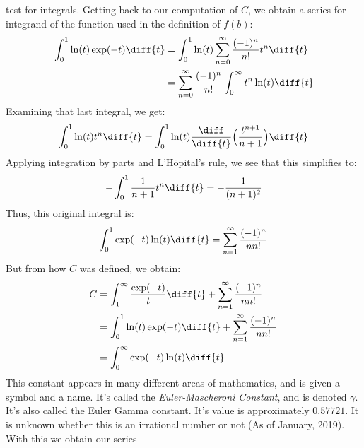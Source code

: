             test for integrals. Getting back to our computation
            of $C$, we obtain a series for integrand of the function
            used in the definition of $f(b)$:
            \begin{align}
                \int_{0}^{1}\ln(t)\exp(-t)\diff{t}
                &=\int_{0}^{1}\ln(t)\sum_{n=0}^{\infty}
                    \frac{(-1)^{n}}{n!}t^{n}\diff{t}\\
                &=\sum_{n=0}^{\infty}\frac{(-1)^{n}}{n!}
                \int_{0}^{\infty}t^{n}\ln(t)\diff{t}
            \end{align}
            Examining that last integral, we get:
            \begin{equation}
                \int_{0}^{1}\ln(t)t^{n}\diff{t}
                =\int_{0}^{1}\ln(t)\frac{\diff}{\diff{t}}
                    \Big(\frac{t^{n+1}}{n+1}\Big)\diff{t}
            \end{equation}
            Applying integration by parts and L'H\"{o}pital's rule,
            we see that this simplifies to:
            \begin{equation}
                -\int_{0}^{1}\frac{1}{n+1}t^{n}\diff{t}
                =-\frac{1}{(n+1)^{2}}
            \end{equation}
            Thus, this original integral is:
            \begin{equation}
                \int_{0}^{1}\exp(-t)\ln(t)\diff{t}
                =\sum_{n=1}^{\infty}\frac{(-1)^{n}}{nn!}
            \end{equation}
            But from how $C$ was defined, we obtain:
            \begin{align}
                C&=\int_{1}^{\infty}\frac{\exp(-t)}{t}\diff{t}
                +\sum_{n=1}^{\infty}\frac{(-1)^{n}}{nn!}\\
                &=\int_{0}^{1}\ln(t)\exp(-t)\diff{t}
                +\sum_{n=1}^{\infty}\frac{(-1)^{n}}{nn!}\\
                &=\int_{0}^{\infty}\exp(-t)\ln(t)\diff{t}
            \end{align}
            This constant appears in many different areas of
            mathematics, and is given a symbol and a name.
            It's called the
            \textit{Euler-Mascheroni Constant}, and is
            denoted $\gamma$. It's also called the Euler Gamma
            constant. It's value is approximately $0.57721$. It is
            unknown whether this is an irrational number or not
            (As of January, 2019). With this we obtain our series
